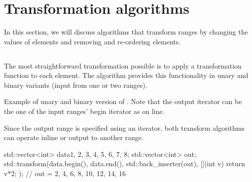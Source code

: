 \section{Transformation algorithms}

In this section, we will discuss algorithms that transform ranges by changing the values of elements and removing and re-ordering elements.

\subsection{\texorpdfstring{}{\texttt{std::transform}}}

The most straightforward transformation possible is to apply a transformation function to each element. The  algorithm provides this functionality in unary and binary variants (input from one or two ranges).





\begin{box-note}
\footnotesize Example of unary and binary version of . Note that the output iterator can be the one of the input ranges' begin iterator as on line.
\tcblower
{}
\end{box-note}


Since the output range is specified using an iterator, both transform algorithms can operate inline or output to another range.

\begin{box-note}
\begin{cppcode}
std::vector<int> data{1, 2, 3, 4, 5, 6, 7, 8};
std::vector<int> out;
std::transform(data.begin(), data.end(),
    std::back_inserter(out), [](int v) { return v*2; });
// out = {2, 4, 6, 8, 10, 12, 14, 16}
\end{cppcode}
\end{box-note}

